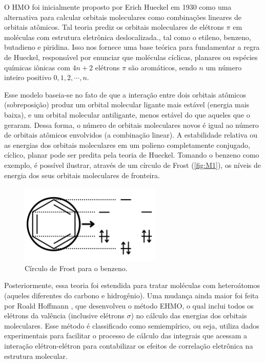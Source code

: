 O \gls{HMO} foi inicialmente proposto por Erich Hueckel em 1930 \autocite{Hckel1931} como uma alternativa para calcular orbitais moleculares como combinações lineares de orbitais atômicos\autocite{Coulson1978-ot}. Tal teoria prediz os orbitais moleculares de elétrons $\pi$ em moléculas com estrutura eletrônica deslocalizada., tal como o etileno, benzeno, butadieno e piridina. Isso nos fornece uma base teórica para fundamentar a regra de Hueckel, responsável por enunciar que moléculas cíclicas, planares ou espécies químicas iônicas com $4n + 2$ elétrons $\pi$ são aromáticos, sendo $n$ um número inteiro positivo $0, 1, 2, \cdots, n$.

Esse modelo baseia-se no fato de que a interação entre dois orbitais atômicos (sobreposição) produz um orbital molecular ligante mais estável (energia mais baixa), e um orbital molecular antiligante, menos estável do que aqueles que o geraram. Dessa forma, o número de orbitais moleculares novos é igual ao número de orbitais atômicos envolvidos (a combinação linear). A estabilidade relativa ou as energias dos orbitais moleculares em um polieno completamente conjugado, cíclico, planar pode ser predita pela teoria de Hueckel. Tomando o benzeno como exemplo, é possível ilustrar, através de um círculo de Frost (\autoref{fig:M1}), os níveis de energia dos seus orbitais moleculares de fronteira.

\begin{figure}[htb]
	\caption{\label{fig:M1} Círculo de Frost para o benzeno.}
	\begin{center}
		\includegraphics[width=0.60\textwidth]{images/figM.png}
	\end{center}
\end{figure}


Posteriormente, essa teoria foi estendida para tratar moléculas com heteroátomos (aqueles diferentes do carbono e hidrogênio)\autocite{Liwschitz1963}. Uma mudança ainda maior foi feita por Roald Hoffmann \autocite{Hoffmann1963}, que desenvolveu o método \gls{EHMO}, o qual inclui todos os elétrons da valência (inclusive elétrons $\sigma$) no cálculo das energias dos orbitais moleculares. Esse método é classificado como semiempírico, ou seja, utiliza dados experimentais para facilitar o processo de cálculo das integrais que acessam a interação elétron-elétron para contabilizar os efeitos de correlação eletrônica na estrutura molecular.

